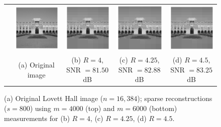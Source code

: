 \begin{figure}[t!]
\begin{center}
\begin{tabular}{ccccc}
			\rotatebox{90}{$~~~~~~~m=6000$} &
			\includegraphics[width=0.22\linewidth]{./fig/lovett_original.pdf} &
			\includegraphics[width=0.22\linewidth]{./fig/lovett_r4_m_6000_s_800.pdf} & 
			\includegraphics[width=0.22\linewidth]{./fig/lovett_r425_m_6000_s_800.pdf} &
			\includegraphics[width=0.22\linewidth]{./fig/lovett_r450_m_6000_s_800.pdf}  \\
			& \small{(a) Original image}& \small{(b) $R=4$, SNR $=81.50$dB}& \small{(c) $R=4.25$, SNR $=82.88$dB}& \small{(d) $R=4.5$, SNR $=83.25$dB} \\
		\end{tabular}
	\end{center}
	\caption{{(a) Original Lovett Hall image ($n=16,384$); sparse reconstructions ($s=800$) using $m=4000$ (top) and $m=6000$ (bottom) measurements for (b) $R=4$, (c) $R=4.25$, (d) $R=4.5$.}}
	\label{fig:lovett}
\end{figure}

